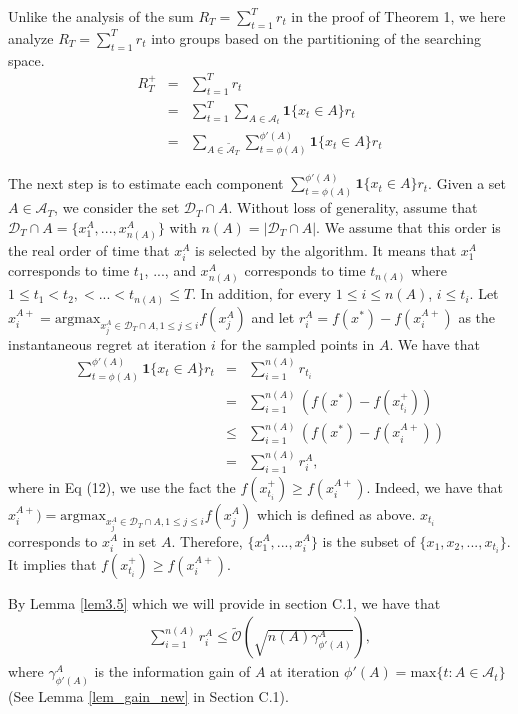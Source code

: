 \documentclass[twoside]{article}
\begin{document}
Unlike the analysis of the sum  $R_T = \sum_{t=1}^{T} r_t$ in the proof of Theorem 1, we here analyze $R_T = \sum_{t=1}^{T} r_t$ into groups based on the partitioning of the searching space.
\begin{eqnarray}
R^+_T  & = & \sum_{t=1}^{T} r_t \\
& = & \sum_{t=1}^{T} \sum_{A \in \mathcal A_t} \textbf{1}\{x_t \in A\}r_t \\
& = & \sum_{A \in \tilde{\mathcal A}_T} \sum_{t =\phi(A)}^{\phi'(A)} \textbf{1}\{x_t \in A\}r_t \label{eq3.00}
\end{eqnarray}

The next step is to estimate each component $\sum_{t =\phi(A)}^{\phi'(A)} \textbf{1}\{x_t \in A\}r_t$. Given a set $A \in \mathcal A_T$, we consider the set $\mathcal D_T \cap A$. Without loss of generality, assume that $\mathcal D_T \cap A = \{x^A_1,..., x^A_{n(A)}\}$ with $n(A) = |\mathcal D_T \cap A|$. We assume that this order is the real order of time that $x^A_i$ is selected by the algorithm. It means that $x^A_1$ corresponds to time $t_1$, ..., and $x^A_{n(A)}$ corresponds to time $t_{n(A)}$
where $1 \le t_1 < t_2, <...< t_{n(A)} \le  T$. In addition, for every $1 \le i \le n(A)$, $i \le t_i$. Let $x^{A+}_i = \text{argmax}_{x^A_j \in \mathcal D_T \cap A, 1\le j \le i} f(x^A_j)$ and let $r^A_i = f(x^*) - f(x^{A+}_i)$ as the instantaneous regret at iteration $i$ for the sampled points in $A$.  We have that
\begin{eqnarray}
\sum_{t =\phi(A)}^{\phi'(A)} \textbf{1}\{x_t \in A\}r_t & = & \sum_{i=1}^{n(A)} r_{t_i} \\
& = & \sum_{i=1}^{n(A)} (f(x^*)   - f(x^+_{t_i})) \\
& \le & \sum_{i=1}^{n(A)} (f(x^*) - f(x^{A+}_i)) \\
& = & \sum_{i=1}^{n(A)}r^A_i,
\end{eqnarray}
where in Eq (12), we use the fact the  $f(x^+_{t_i}) \ge f(x^{A+}_i)$. Indeed, we have that $x^{A+}_i) = \text{argmax}_{x^A_j \in \mathcal D_T \cap A, 1\le j \le i} f(x^A_j)$ which is defined as above. $x_{t_i}$ corresponds to $x^A_i$ in set $A$. Therefore, $\{x^A_1, ..., x^A_i \}$ is the subset of $\{x_1, x_2, ..., x_{t_i}\}$. It implies that $f(x^+_{t_i}) \ge f(x^{A+}_i)$.

By Lemma \ref{lem3.5} which we will provide in section C.1, we have that
\begin{eqnarray}
\sum_{i=1}^{n(A)}r^A_i \le \tilde{\mathcal O}( \sqrt{n(A)\gamma^A_{\phi'(A)}}),
\label{eq3.0}
\end{eqnarray}
where $\gamma^A_{\phi'(A)}$ is the information gain of $A$ at iteration $\phi'(A) = \text{max}\{t: A\in \mathcal A_t\}$ (See Lemma \ref{lem_gain_new} in  Section C.1).
\end{document}
